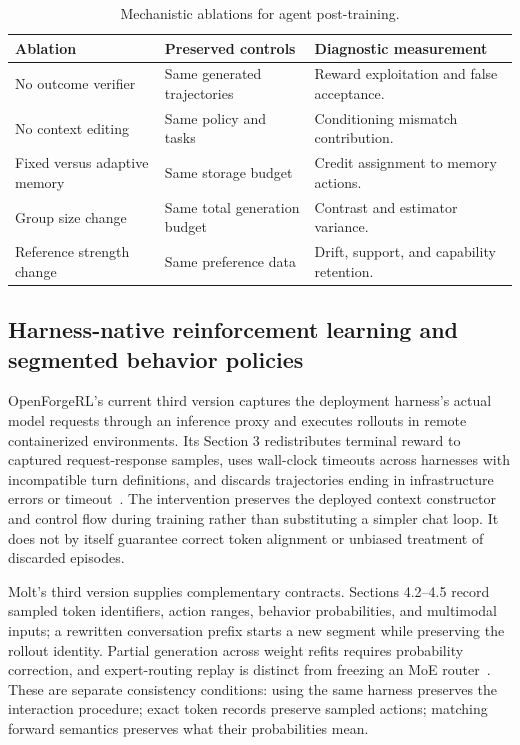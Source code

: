 {\small\setlength{\tabcolsep}{3pt}
\begin{table}[!htbp]
\centering
\caption{Mechanistic ablations for agent post-training.}\label{tab:C08:ablations}
\begin{tabular}{L{29mm}L{37mm}L{40mm}}

\toprule Ablation & Preserved controls & Diagnostic measurement\\\midrule
No outcome verifier & Same generated trajectories & Reward exploitation and false acceptance.\\
No context editing & Same policy and tasks & Conditioning mismatch contribution.\\
Fixed versus adaptive memory & Same storage budget & Credit assignment to memory actions.\\
Group size change & Same total generation budget & Contrast and estimator variance.\\
Reference strength change & Same preference data & Drift, support, and capability retention.\\
\bottomrule
\end{tabular}
\end{table}
}

\subsection{Harness-native reinforcement learning and segmented behavior policies}
\label{sec:C08:harnessnative}
OpenForgeRL's current third version captures the deployment harness's actual model requests through an inference proxy and executes rollouts in remote containerized environments. Its Section 3 redistributes terminal reward to captured request-response samples, uses wall-clock timeouts across harnesses with incompatible turn definitions, and discards trajectories ending in infrastructure errors or timeout~\cite{rewrite_openforge2026}. The intervention preserves the deployed context constructor and control flow during training rather than substituting a simpler chat loop. It does not by itself guarantee correct token alignment or unbiased treatment of discarded episodes.

Molt's third version supplies complementary contracts. Sections 4.2--4.5 record sampled token identifiers, action ranges, behavior probabilities, and multimodal inputs; a rewritten conversation prefix starts a new segment while preserving the rollout identity. Partial generation across weight refits requires probability correction, and expert-routing replay is distinct from freezing an MoE router~\cite{rewrite_molt2026}. These are separate consistency conditions: using the same harness preserves the interaction procedure; exact token records preserve sampled actions; matching forward semantics preserves what their probabilities mean.

